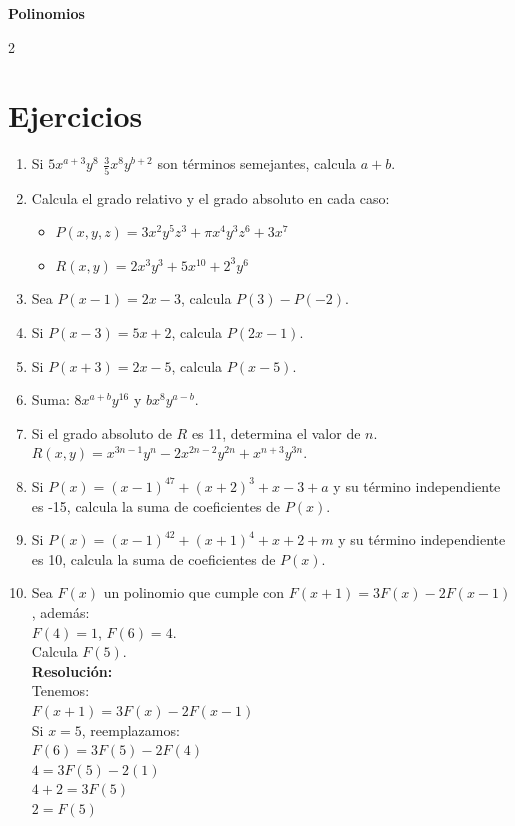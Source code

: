 \documentclass[10pt]{article}
\begin{document}
	\begin{center}
		\Large\bfseries Polinomios
	\end{center}

\begin{multicols}{2}
	\section*{Ejercicios}
		\begin{enumerate}[label=\textbf{\arabic*.}, itemsep=0.4cm]
			\item Si $5x^{a+3} y^{8}$  $\frac{3}{5} x^8 y^{b+2}$ son términos semejantes, calcula $a + b$.

			\item Calcula el grado relativo y el grado absoluto en cada caso:
			\begin{itemize}
				\item $P(x, y, z) = 3x^2 y^5 z^3 + \pi x^4 y^3 z^6 + 3x^7$
				\item $R(x, y) = 2x^3 y^3 + 5x^{10} + 2^3 y^6$
			\end{itemize}

			\item Sea $P(x - 1) = 2x - 3$, calcula $P(3) - P(-2)$.

			\item Si $P(x - 3) = 5x + 2$, calcula $P(2x - 1)$.\\


			\item Si $P(x + 3) = 2x - 5$, calcula $P(x - 5)$.

			\item Suma: $8x^{a+b} y^{16}$ y $bx^8 y^{a-b}$.

			\item Si el grado absoluto de $R$ es 11, determina el valor de $n$. \\
			$R(x, y) = x^{3n-1} y^n - 2x^{2n-2} y^{2n} + x^{n+3} y^{3n}$.

			\item Si $P(x) = (x - 1)^{47} + (x + 2)^3 + x - 3 + a$ y su término independiente es -15, calcula la suma de coeficientes de $P(x)$.

			\item Si $P(x) = (x - 1)^{42} + (x + 1)^4 + x + 2 + m$ y su término independiente es 10, calcula la suma de coeficientes de $P(x)$.

			\item Sea $F(x)$ un polinomio que cumple con $F(x + 1) = 3F(x) - 2F(x - 1)$, además: \\
			$F(4) = 1$, $F(6) = 4$. \\
			Calcula $F(5)$. \\
			\textbf{Resolución:} \\
			Tenemos: \\
			$F(x + 1) = 3F(x) - 2F(x - 1)$ \\
			Si $x = 5$, reemplazamos: \\
			$F(6) = 3F(5) - 2F(4)$ \\
			$4 = 3F(5) - 2(1)$ \\
			$4 + 2 = 3F(5)$ \\
			$2 = F(5)$


\end{enumerate}
\end{multicols}
\end{document}

